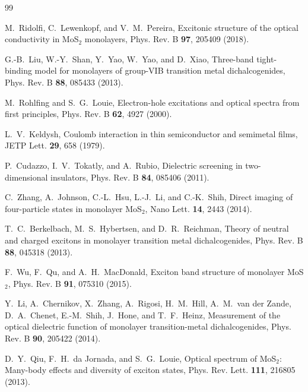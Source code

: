 \documentclass[11pt,a4paper]{ctexart}
\begin{document}
\begin{thebibliography}{99}

M.~Ridolfi, C.~Lewenkopf, and V.~M.~Pereira,
Excitonic structure of the optical conductivity in MoS$_2$ monolayers,
Phys. Rev. B \textbf{97}, 205409 (2018).

G.-B.~Liu, W.-Y.~Shan, Y.~Yao, W.~Yao, and D.~Xiao,
Three-band tight-binding model for monolayers of group-VIB transition metal dichalcogenides,
Phys. Rev. B \textbf{88}, 085433 (2013).

M.~Rohlfing and S.~G.~Louie,
Electron-hole excitations and optical spectra from first principles,
Phys. Rev. B \textbf{62}, 4927 (2000).

L.~V.~Keldysh,
Coulomb interaction in thin semiconductor and semimetal films,
JETP Lett. \textbf{29}, 658 (1979).

P.~Cudazzo, I.~V.~Tokatly, and A.~Rubio,
Dielectric screening in two-dimensional insulators,
Phys. Rev. B \textbf{84}, 085406 (2011).

C.~Zhang, A.~Johnson, C.-L.~Hsu, L.-J.~Li, and C.-K.~Shih,
Direct imaging of four-particle states in monolayer MoS$_2$,
Nano Lett. \textbf{14}, 2443 (2014).

T.~C.~Berkelbach, M.~S.~Hybertsen, and D.~R.~Reichman,
Theory of neutral and charged excitons in monolayer transition metal dichalcogenides,
Phys. Rev. B \textbf{88}, 045318 (2013).

F.~Wu, F.~Qu, and A.~H.~MacDonald,
Exciton band structure of monolayer MoS$_2$,
Phys. Rev. B \textbf{91}, 075310 (2015).

Y.~Li, A.~Chernikov, X.~Zhang, A.~Rigosi, H.~M.~Hill, A.~M.~van der Zande,
D.~A.~Chenet, E.-M.~Shih, J.~Hone, and T.~F.~Heinz,
Measurement of the optical dielectric function of monolayer transition-metal dichalcogenides,
Phys. Rev. B \textbf{90}, 205422 (2014).

D.~Y.~Qiu, F.~H.~da Jornada, and S.~G.~Louie,
Optical spectrum of MoS$_2$: Many-body effects and diversity of exciton states,
Phys. Rev. Lett. \textbf{111}, 216805 (2013).

\end{thebibliography}
\end{document}
